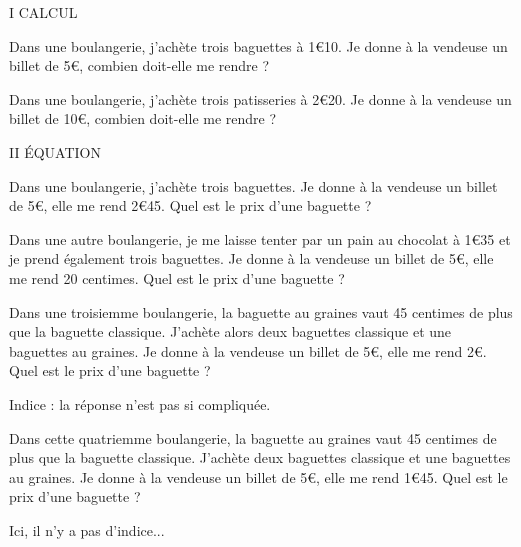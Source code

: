 I CALCUL

Dans une boulangerie, j'achète trois baguettes à 1€10. Je donne à la vendeuse un billet de 5€, combien doit-elle me rendre ?


Dans une boulangerie, j'achète trois patisseries à 2€20. Je donne à la vendeuse un billet de 10€, combien doit-elle me rendre ?












II  ÉQUATION

Dans une boulangerie, j'achète trois baguettes. Je donne à la vendeuse un billet de 5€, elle me rend 2€45. Quel est le prix d'une baguette ?



Dans une autre boulangerie, je me laisse tenter par un pain au chocolat à 1€35 et je prend également trois baguettes. Je donne à la vendeuse un billet de 5€, elle me rend 20 centimes. Quel est le prix d'une baguette ?



Dans une troisiemme boulangerie, la baguette au graines vaut 45 centimes de plus que la baguette classique. J'achète alors deux baguettes classique et une baguettes au graines. Je donne à la vendeuse un billet de 5€, elle me rend 2€. Quel est le prix d'une baguette ?

Indice : la réponse n'est pas si compliquée.




Dans cette quatriemme boulangerie, la baguette au graines vaut 45 centimes de plus que la baguette classique. J'achète deux baguettes classique et une baguettes au graines. Je donne à la vendeuse un billet de 5€, elle me rend 1€45. Quel est le prix d'une baguette ?

Ici, il n'y a pas d'indice...
